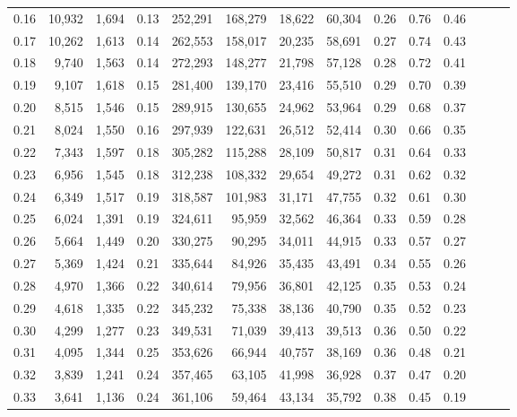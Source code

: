 \begin{tabular}{rrrrrrrrrrrrrr}
0.16 &  10,932 &  1,694 &  0.13 &  252,291 &  168,279 &  18,622 &  60,304 &  0.26 &  0.76 &      0.46 \\
0.17 &  10,262 &  1,613 &  0.14 &  262,553 &  158,017 &  20,235 &  58,691 &  0.27 &  0.74 &      0.43 \\
0.18 &   9,740 &  1,563 &  0.14 &  272,293 &  148,277 &  21,798 &  57,128 &  0.28 &  0.72 &      0.41 \\
0.19 &   9,107 &  1,618 &  0.15 &  281,400 &  139,170 &  23,416 &  55,510 &  0.29 &  0.70 &      0.39 \\
0.20 &   8,515 &  1,546 &  0.15 &  289,915 &  130,655 &  24,962 &  53,964 &  0.29 &  0.68 &      0.37 \\
0.21 &   8,024 &  1,550 &  0.16 &  297,939 &  122,631 &  26,512 &  52,414 &  0.30 &  0.66 &      0.35 \\
0.22 &   7,343 &  1,597 &  0.18 &  305,282 &  115,288 &  28,109 &  50,817 &  0.31 &  0.64 &      0.33 \\
0.23 &   6,956 &  1,545 &  0.18 &  312,238 &  108,332 &  29,654 &  49,272 &  0.31 &  0.62 &      0.32 \\
0.24 &   6,349 &  1,517 &  0.19 &  318,587 &  101,983 &  31,171 &  47,755 &  0.32 &  0.61 &      0.30 \\
0.25 &   6,024 &  1,391 &  0.19 &  324,611 &   95,959 &  32,562 &  46,364 &  0.33 &  0.59 &      0.28 \\
0.26 &   5,664 &  1,449 &  0.20 &  330,275 &   90,295 &  34,011 &  44,915 &  0.33 &  0.57 &      0.27 \\
0.27 &   5,369 &  1,424 &  0.21 &  335,644 &   84,926 &  35,435 &  43,491 &  0.34 &  0.55 &      0.26 \\
0.28 &   4,970 &  1,366 &  0.22 &  340,614 &   79,956 &  36,801 &  42,125 &  0.35 &  0.53 &      0.24 \\
0.29 &   4,618 &  1,335 &  0.22 &  345,232 &   75,338 &  38,136 &  40,790 &  0.35 &  0.52 &      0.23 \\
0.30 &   4,299 &  1,277 &  0.23 &  349,531 &   71,039 &  39,413 &  39,513 &  0.36 &  0.50 &      0.22 \\
0.31 &   4,095 &  1,344 &  0.25 &  353,626 &   66,944 &  40,757 &  38,169 &  0.36 &  0.48 &      0.21 \\
0.32 &   3,839 &  1,241 &  0.24 &  357,465 &   63,105 &  41,998 &  36,928 &  0.37 &  0.47 &      0.20 \\
0.33 &   3,641 &  1,136 &  0.24 &  361,106 &   59,464 &  43,134 &  35,792 &  0.38 &  0.45 &      0.19 \\

\end{tabular}
